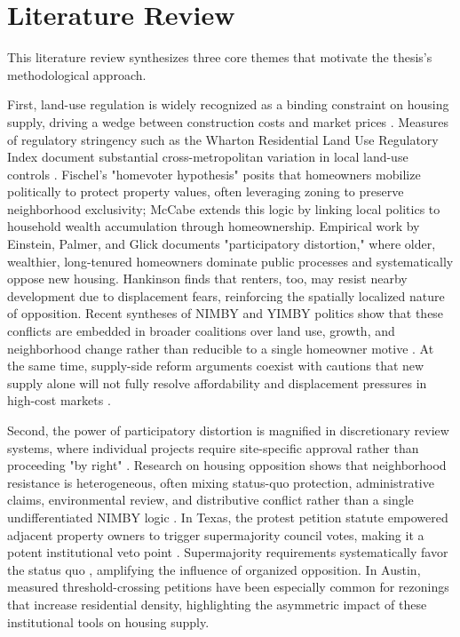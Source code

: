 \documentclass[11pt, letterpaper]{article}
\begin{document}
\section{Literature Review}

This literature review synthesizes three core themes that motivate the thesis's methodological approach.

First, land-use regulation is widely recognized as a binding constraint on housing supply, driving a wedge between construction costs and market prices \cite{glaeser2005manhattan, glaeser2003zoning, gyourko2015regulation,quigley2005effects}. Measures of regulatory stringency such as the Wharton Residential Land Use Regulatory Index document substantial cross-metropolitan variation in local land-use controls \cite{gyourko2008wrluri,gyourko2021local}. Fischel's "homevoter hypothesis" \cite{fischel2001homevoter} posits that homeowners mobilize politically to protect property values, often leveraging zoning to preserve neighborhood exclusivity; McCabe \cite{mccabe2016} extends this logic by linking local politics to household wealth accumulation through homeownership. Empirical work by Einstein, Palmer, and Glick \cite{einstein2019book} documents "participatory distortion," where older, wealthier, long-tenured homeowners dominate public processes and systematically oppose new housing. Hankinson \cite{hankinson2018} finds that renters, too, may resist nearby development due to displacement fears, reinforcing the spatially localized nature of opposition. Recent syntheses of NIMBY and YIMBY politics show that these conflicts are embedded in broader coalitions over land use, growth, and neighborhood change rather than reducible to a single homeowner motive \cite{brouwer2024nimbys}. At the same time, supply-side reform arguments coexist with cautions that new supply alone will not fully resolve affordability and displacement pressures in high-cost markets \cite{hamilton2023reform,been2019supply}.

Second, the power of participatory distortion is magnified in discretionary review systems, where individual projects require site-specific approval rather than proceeding "by right" \cite{manville2016unpermitted, hills2011zoning}. Research on housing opposition shows that neighborhood resistance is heterogeneous, often mixing status-quo protection, administrative claims, environmental review, and distributive conflict rather than a single undifferentiated NIMBY logic \cite{pendall1999opposition,schively2007nimby}. In Texas, the protest petition statute empowered adjacent property owners to trigger supermajority council votes, making it a potent institutional veto point \cite{texas211006,furth2023invisible}. Supermajority requirements systematically favor the status quo \cite{cellini2010schools}, amplifying the influence of organized opposition. In Austin, measured threshold-crossing petitions have been especially common for rezonings that increase residential density, highlighting the asymmetric impact of these institutional tools on housing supply.
\end{document}
